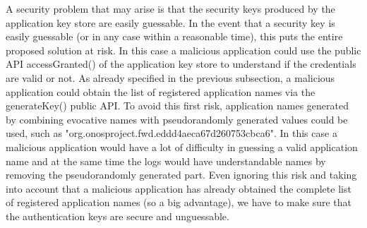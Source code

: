 \documentclass[a4paper,10pt]{memoir}
\begin{document}
A security problem that may arise is that the security keys produced by the application key store are easily guessable. In the event that a security key is easily guessable (or in any case within a reasonable time), this puts the entire proposed solution at risk. In this case a malicious application could use the public API accessGranted() of the application key store to understand if the credentials are valid or not. As already specified in the previous subsection, a malicious application could obtain the list of registered application names via the generateKey() public API. To avoid this first risk, application names generated by combining evocative names with pseudorandomly generated values could be used, such as "org.onosproject.fwd.eddd4aeca67d260753cbca6". In this case a malicious application would have a lot of difficulty in guessing a valid application name and at the same time the logs would have understandable names by removing the pseudorandomly generated part. Even ignoring this risk and taking into account that a malicious application has already obtained the complete list of registered application names (so a big advantage), we have to make sure that the authentication keys are secure and unguessable.
\medskip
\end{document}
